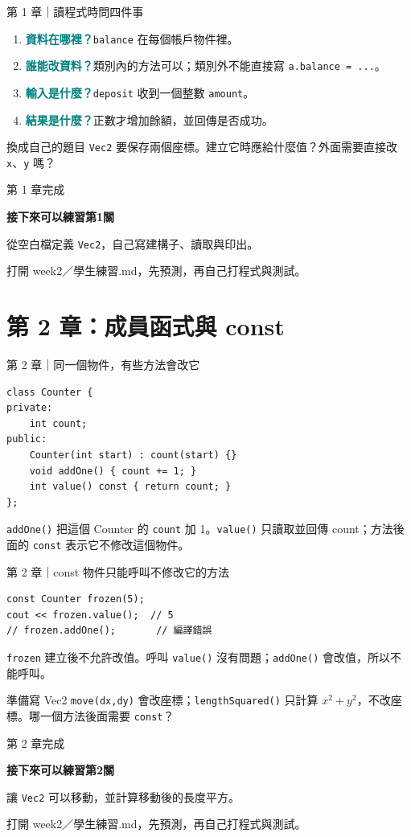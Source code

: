 \documentclass[aspectratio=169,11pt]{beamer}
\newcommand{\key}[1]{\textcolor{teal}{\textbf{#1}}}
\newcommand{\practice}[2]{%
  \begin{frame}[plain]
    \vspace*{1.5cm}
    {\large\color{muted} 第 #1 章完成}\par\vspace{0.45cm}
    {\Huge\bfseries\color{teal} 接下來可以練習第#1關}\par\vspace{0.7cm}
    {\Large #2}\par\vfill
    {\small\color{muted} 打開 week2／學生練習.md，先預測，再自己打程式與測試。}
  \end{frame}
}
\begin{document}
\begin{frame}{第 1 章｜讀程式時問四件事}
  \begin{enumerate}
    \item \key{資料在哪裡？}\quad \texttt{balance} 在每個帳戶物件裡。
    \item \key{誰能改資料？}\quad 類別內的方法可以；類別外不能直接寫 \texttt{a.balance = ...}。
    \item \key{輸入是什麼？}\quad \texttt{deposit} 收到一個整數 \texttt{amount}。
    \item \key{結果是什麼？}\quad 正數才增加餘額，並回傳是否成功。
  \end{enumerate}
  \vspace{0.7em}
  \begin{block}{換成自己的題目}
    \texttt{Vec2} 要保存兩個座標。建立它時應給什麼值？外面需要直接改 \texttt{x}、\texttt{y} 嗎？
  \end{block}
\end{frame}
\practice{1}{從空白檔定義 \texttt{Vec2}，自己寫建構子、讀取與印出。}

\section{第 2 章：成員函式與 const}
\begin{frame}[fragile]{第 2 章｜同一個物件，有些方法會改它}
\begin{lstlisting}
class Counter {
private:
    int count;
public:
    Counter(int start) : count(start) {}
    void addOne() { count += 1; }
    int value() const { return count; }
};
\end{lstlisting}
  \texttt{addOne()} 把這個 Counter 的 \texttt{count} 加 1。\texttt{value()} 只讀取並回傳 count；方法後面的 \texttt{const} 表示它不修改這個物件。
\end{frame}

\begin{frame}[fragile]{第 2 章｜const 物件只能呼叫不修改它的方法}
\begin{lstlisting}
const Counter frozen(5);
cout << frozen.value();  // 5
// frozen.addOne();       // 編譯錯誤
\end{lstlisting}
  \texttt{frozen} 建立後不允許改值。呼叫 \texttt{value()} 沒有問題；\texttt{addOne()} 會改值，所以不能呼叫。
  \begin{block}{準備寫 Vec2}
    \texttt{move(dx,dy)} 會改座標；\texttt{lengthSquared()} 只計算 $x^2+y^2$，不改座標。哪一個方法後面需要 \texttt{const}？
  \end{block}
\end{frame}
\practice{2}{讓 \texttt{Vec2} 可以移動，並計算移動後的長度平方。}
\end{document}
